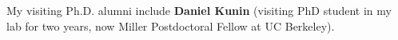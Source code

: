 \smallskip
\noindent My visiting Ph.D. alumni include \textbf{Daniel Kunin} (visiting PhD student in my lab for two years, now Miller Postdoctoral Fellow at UC Berkeley).





